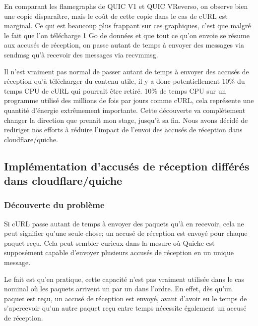 En comparant les flamegraphs de QUIC V1 et QUIC VReverso, on observe bien une copie disparaître, mais le coût de cette copie dans le cas de cURL est marginal. Ce qui est beaucoup plus frappant sur ces graphiques, c'est que malgré le fait que l'on télécharge 1 Go de données et que tout ce qu'on envoie se résume aux accusés de réception, on passe autant de temps à envoyer des messages via sendmsg qu'à recevoir des messages via recvmmsg.

\vspace{0.5cm}

Il n'est vraiment pas normal de passer autant de temps à envoyer des accusés de réception qu'à télécharger du contenu utile, il y a donc potentiellement 10\% du temps CPU de cURL qui pourrait être retiré. 10\% de temps CPU sur un programme utilisé des millions de fois par jours comme cURL, cela représente une quantité d'énergie extrêmement importante. Cette découverte va complètement changer la direction que prenait mon stage, jusqu'à sa fin. Nous avons décidé de rediriger nos efforts à réduire l'impact de l'envoi des accusés de réception dans cloudflare/quiche.

\newpage

\subsection{Implémentation d'accusés de réception différés dans cloudflare/quiche}

\subsubsection{Découverte du problème}

Si cURL passe autant de temps à envoyer des paquets qu'à en recevoir, cela ne peut signifier qu'une seule chose; un accusé de réception est envoyé pour chaque paquet reçu.
Cela peut sembler curieux dans la mesure où Quiche est supposément capable d'envoyer plusieurs accusés de réception en un unique message.

Le fait est qu'en pratique, cette capacité n'est pas vraiment utilisée dans le cas nominal où les paquets arrivent un par un dans l'ordre. En effet, dès qu'un paquet est reçu, un accusé de réception est envoyé, avant d'avoir eu le temps de s'apercevoir qu'un autre paquet reçu entre temps nécessite également un accusé de réception.

